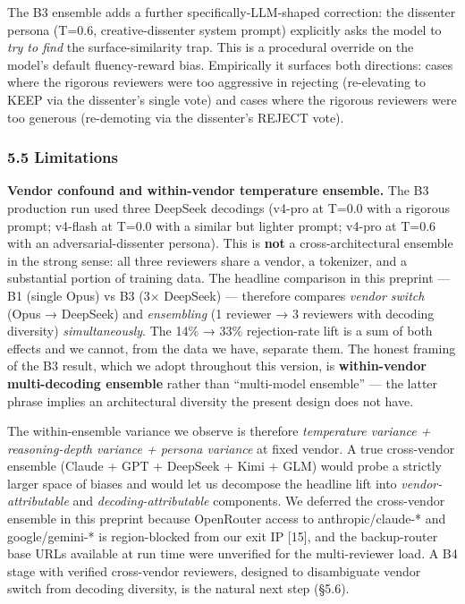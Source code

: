 \documentclass[
  letterpaper,
  11pt]{article}
\begin{document}
The B3 ensemble adds a further specifically-LLM-shaped correction: the
dissenter persona (T=0.6, creative-dissenter system prompt) explicitly
asks the model to \emph{try to find} the surface-similarity trap. This
is a procedural override on the model's default fluency-reward bias.
Empirically it surfaces both directions: cases where the rigorous
reviewers were too aggressive in rejecting (re-elevating to KEEP via the
dissenter's single vote) and cases where the rigorous reviewers were too
generous (re-demoting via the dissenter's REJECT vote).

\subsubsection{5.5 Limitations}\label{limitations}

\textbf{Vendor confound and within-vendor temperature ensemble.} The B3
production run used three DeepSeek decodings (v4-pro at T=0.0 with a
rigorous prompt; v4-flash at T=0.0 with a similar but lighter prompt;
v4-pro at T=0.6 with an adversarial-dissenter persona). This is
\textbf{not} a cross-architectural ensemble in the strong sense: all
three reviewers share a vendor, a tokenizer, and a substantial portion
of training data. The headline comparison in this preprint --- B1
(single Opus) vs B3 (3× DeepSeek) --- therefore compares \emph{vendor
switch} (Opus → DeepSeek) and \emph{ensembling} (1 reviewer → 3
reviewers with decoding diversity) \emph{simultaneously}. The 14\% →
33\% rejection-rate lift is a sum of both effects and we cannot, from
the data we have, separate them. The honest framing of the B3 result,
which we adopt throughout this version, is \textbf{within-vendor
multi-decoding ensemble} rather than ``multi-model ensemble'' --- the
latter phrase implies an architectural diversity the present design does
not have.

The within-ensemble variance we observe is therefore \emph{temperature
variance + reasoning-depth variance + persona variance} at fixed vendor.
A true cross-vendor ensemble (Claude + GPT + DeepSeek + Kimi + GLM)
would probe a strictly larger space of biases and would let us decompose
the headline lift into \emph{vendor-attributable} and
\emph{decoding-attributable} components. We deferred the cross-vendor
ensemble in this preprint because OpenRouter access to
anthropic/claude-* and google/gemini-* is region-blocked from our exit
IP {[}15{]}, and the backup-router base URLs available at run time were
unverified for the multi-reviewer load. A B4 stage with verified
cross-vendor reviewers, designed to disambiguate vendor switch from
decoding diversity, is the natural next step (§5.6).
\end{document}
